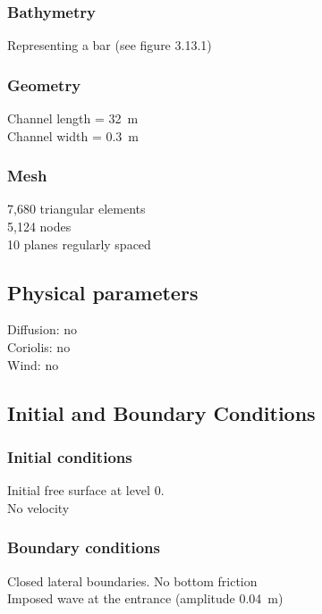 \subsubsection{Bathymetry}
%
Representing a bar (see figure 3.13.1)
%
\subsubsection{Geometry}
%
Channel length = 32~m\\
Channel width = 0.3~m
%
\subsubsection{Mesh}
%
7,680 triangular elements\\
5,124 nodes\\
10 planes regularly spaced
%
%
%
\subsection{Physical parameters}
%
Diffusion: no\\
Coriolis: no\\
Wind: no
%
%
%
%
%
%
\subsection{Initial and Boundary Conditions}
%
\subsubsection{Initial conditions}
%
Initial free surface at level 0.\\
No velocity
%
\subsubsection{Boundary conditions}
%
Closed lateral boundaries. No bottom friction\\
Imposed wave at the entrance (amplitude 0.04~m)
%

